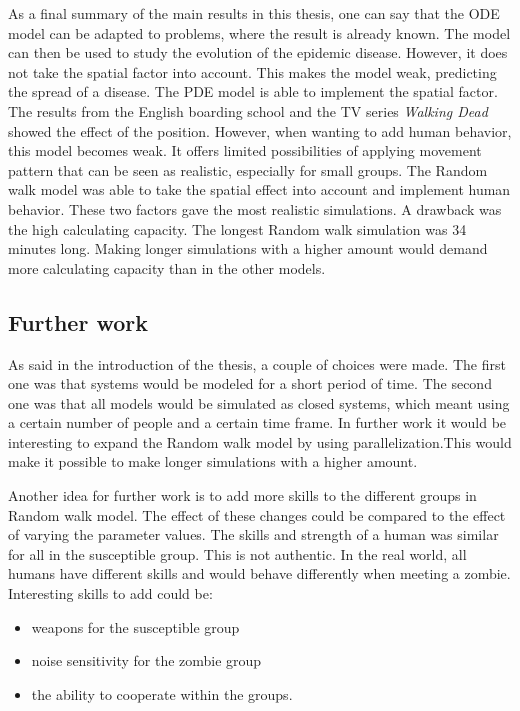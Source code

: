 \documentclass[%
twoside,                 %
final,                   %
chapterprefix=true,      %
open=right               %
10pt]{book}
\begin{document}
As a final summary of the main results in this thesis, one can say that the ODE model can be adapted to problems, where the result is already known. The model can then be used to study the evolution of the epidemic disease. However, it does not take the spatial factor into account. This makes the model weak, predicting the spread of a disease. The PDE model is able to implement the spatial factor. The results from the English boarding school and the TV series \emph{Walking Dead} showed the effect of the position. However, when wanting to add human behavior, this model becomes weak. It offers limited possibilities of applying movement pattern that can be seen as realistic, especially for small groups. The Random walk model was able to take the spatial effect into account and implement human behavior. These two factors gave the most realistic simulations. A drawback was the high calculating capacity. The longest Random walk simulation was 34 minutes long. Making longer simulations with a higher amount would demand more calculating capacity than in the other models.  

\subsection{Further work}
\label{section:4_further_work}
As said in the introduction of the thesis, a couple of choices were made. The first one was that systems would be modeled for a short period of time. The second one was that all models would be simulated as closed systems, which meant using a certain number of people and a certain time frame. In further work it would be interesting to expand the Random walk model by using parallelization.This would make it possible to make longer simulations with a higher amount.


\vspace{3mm}




\vspace{3mm}


Another idea for further work is to add more skills to the different groups in Random walk model. The effect of these changes could be compared to the effect of varying the parameter values. The skills and strength of a human was similar for all in the susceptible group. This is not authentic. In the real world, all humans have different skills and would behave differently when meeting a zombie. Interesting skills to add could be:
\begin{itemize}
\item weapons for the susceptible group

\item noise sensitivity for the zombie group

\item the ability to cooperate within the groups.
\end{itemize}
\end{document}
